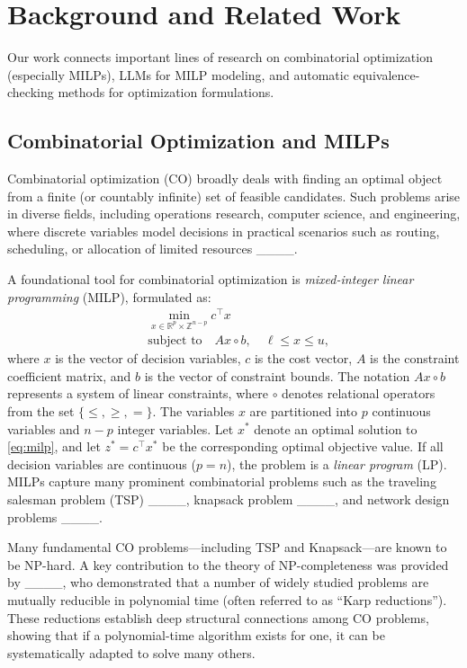 \section{Background and Related Work}
\label{sec:related-work}

Our work connects important lines of research on combinatorial optimization (especially MILPs), LLMs for MILP modeling, and automatic equivalence-checking methods for optimization formulations.

\subsection{Combinatorial Optimization and MILPs}

Combinatorial optimization (CO) broadly deals with finding an optimal object from a finite (or countably infinite) set of feasible candidates. Such problems arise in diverse fields, including operations research, computer science, and engineering, where discrete variables model decisions in practical scenarios such as routing, scheduling, or allocation of limited resources ____. 

A foundational tool for combinatorial optimization is \emph{mixed-integer linear programming} (MILP), formulated as:
\begin{equation}
\label{eq:milp}
\begin{aligned}
& \min_{x \in \mathbb{R}^p \times \mathbb{Z}^{n-p}}  c^\top x \\
& \text{subject to} \quad A x \circ b, \quad \ell \leq x \leq u,
\end{aligned}
\end{equation}
where \( x \) is the vector of decision variables, \( c \) is the cost vector, \( A \) is the constraint coefficient matrix, and \( b \) is the vector of constraint bounds. The notation \( A x \circ b \) represents a system of linear constraints, where \( \circ \) denotes relational operators from the set \(\{\leq, \geq, =\}\). The variables \( x \) are partitioned into \( p \) continuous variables and \( n - p \) integer variables. Let \( x^* \) denote an optimal solution to \eqref{eq:milp}, and let \(z^* = c^\top x^*\) be the corresponding optimal objective value. If all decision variables are continuous (\( p = n \)), the problem is a \emph{linear program} (LP).
 MILPs capture many prominent combinatorial problems such as the traveling salesman problem (TSP) ____, knapsack problem ____, and network design problems ____.

Many fundamental CO problems---including TSP and Knapsack---are known to be NP-hard. A key contribution to the theory of NP-completeness was provided by ____, who demonstrated that a number of widely studied problems are mutually reducible in polynomial time (often referred to as ``Karp reductions''). These reductions establish deep structural connections among CO problems, showing that if a polynomial-time algorithm exists for one, it can be systematically adapted to solve many others. 


